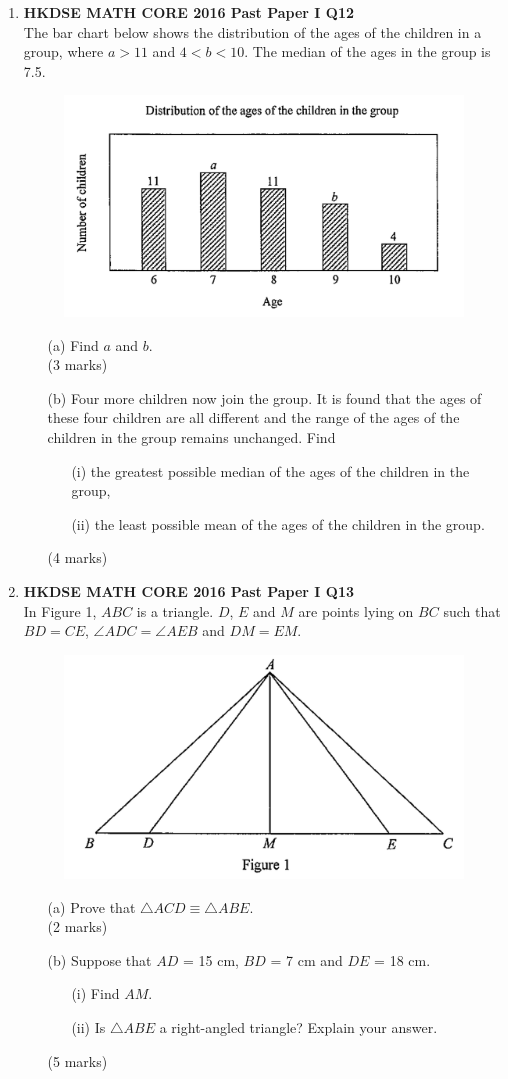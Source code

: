 \documentclass[12pt]{article}
\begin{document}
\begin{enumerate}
	\item \textbf{HKDSE MATH CORE 2016 Past Paper I Q12}\\
	The bar chart below shows the distribution of the ages of the children in a group, where $a > 11$ and $4 < b < 10$. The median of the ages in the group is 7.5.
	\begin{figure}[H]
		\centering
		\includegraphics[width = .3\linewidth]{2016Figure1.00}
	\end{figure}
	\begin{enumerate}
		\item[(a)] Find $a$ and $b$. \\(3 marks)
		\item[(b)] Four more children now join the group. It is found that the ages of these four children are all different and the range of the ages of the children in the group remains unchanged. Find
		\begin{enumerate}
			\item[(i)] the greatest possible median of the ages of the children in the group,
			\item[(ii)] the least possible mean of the ages of the children in the group.
		\end{enumerate}
		(4 marks)
	\end{enumerate}

	\item \textbf{HKDSE MATH CORE 2016 Past Paper I Q13}\\
	In Figure 1, $ABC$ is a triangle. $D$, $E$ and $M$ are points lying on $BC$ such that $BD = CE$, $\angle ADC = \angle AEB$ and $DM = EM$.
	\begin{figure}[H]
		\centering
		\includegraphics[width = .3\linewidth]{2016Figure1.1}
	\end{figure}
	\begin{enumerate}
		\item[(a)] Prove that $\triangle ACD \equiv \triangle ABE$. \\(2 marks)
		\item[(b)] Suppose that $AD$ = 15 cm, $BD$ = 7 cm and $DE$ = 18 cm.
		\begin{enumerate}
			\item[(i)] Find $AM$.
			\item[(ii)] Is $\triangle ABE$ a right-angled triangle? Explain your answer.
		\end{enumerate}
		(5 marks)
	\end{enumerate}


\end{enumerate}
\end{document}
